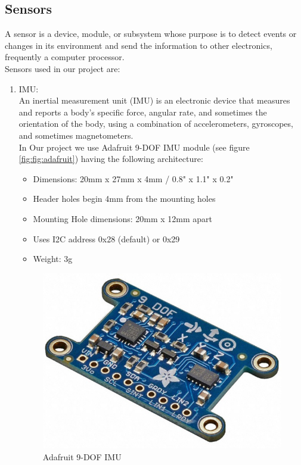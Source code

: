 \subsection{Sensors}
\hspace{2cm}A sensor is a device, module, or subsystem whose purpose is to detect events or changes in its environment and send the information to other electronics, frequently a computer processor. \cite{web007} \\
Sensors used in our project are:
\begin{enumerate}
   \item IMU: \\
   An inertial measurement unit (IMU) is an electronic device that measures and reports a body's specific force, angular rate, and sometimes the orientation of the body, using a combination of accelerometers, gyroscopes, and sometimes magnetometers. \cite{web008}\\
   In Our project we use Adafruit 9-DOF IMU module (see figure \ref{fig:fig:adafruit}) having the following architecture:

    \begin{itemize}
        \item Dimensions: 20mm x 27mm x 4mm / 0.8" x 1.1" x 0.2"
        \item Header holes begin 4mm from the mounting holes
        \item Mounting Hole dimensions: 20mm x 12mm apart
        \item Uses I2C address 0x28 (default) or 0x29
        \item Weight: 3g 
    \end{itemize}{}

   \begin{figure}[H]%
    \center%
    \includegraphics[width=.5\textwidth]
    {images/Alzahraa/imu_Adafruit.jpg}%
    \caption[IMU Adafruit]{Adafruit 9-DOF IMU}\label{fig:adafruit}%
  \end{figure}
   

\end{enumerate}
